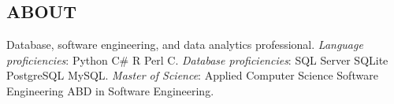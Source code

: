 \documentclass[margin, 10pt]{res} %
\begin{document}
\begin{resume}

 
\section{ABOUT}  

    Database, software engineering, and data analytics professional. 
    \textit{Language proficiencies}:  Python \textpipe{}  C\# \textpipe{}   R \textpipe{}      Perl \textpipe{}    C. 
    \textit{Database proficiencies}: SQL Server \textpipe{}    SQLite \textpipe{}    PostgreSQL \textpipe{}    MySQL. 
    \textit{Master of Science}: Applied Computer Science \textpipe{}    Software Engineering \textpipe{}   
    ABD in Software Engineering. 





\end{resume}
\end{document}
